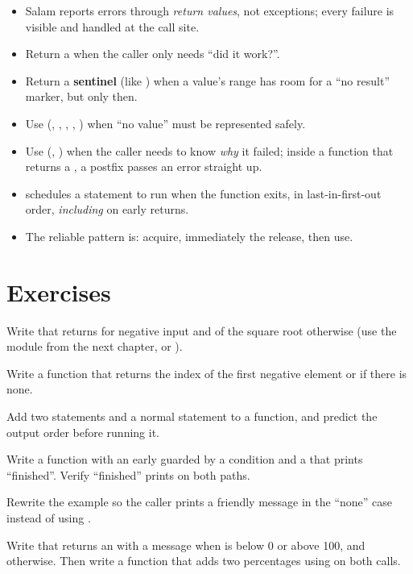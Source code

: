 \begin{itemize}[leftmargin=1.4em]
  \item Salam reports errors through \emph{return values}, not exceptions; every
        failure is visible and handled at the call site.
  \item Return a  when the caller only needs ``did it work?''.
  \item Return a \textbf{sentinel} (like ) when a value's range has room
        for a ``no result'' marker, but only then.
  \item Use  (, , ,
        , ) when ``no value'' must be represented safely.
  \item Use  (, ) when the caller
        needs to know \emph{why} it failed; inside a function that returns a
        , a postfix  passes an error straight up.
  \item {} schedules a statement to run when the function exits, in
        last-in-first-out order, \emph{including} on early returns.
  \item The reliable pattern is: acquire, immediately  the release,
        then use.
\end{itemize}

\section{Exercises}

\exercise Write  that returns
 for negative input and  of the square root otherwise (use
the  module from the next chapter, or ).

\exercise Write a function  that returns
the index of the first negative element or  if there is none.

\exercise Add two  statements and a normal statement to a function,
and predict the output order before running it.

\exercise Write a function with an early  guarded by a condition and a
 that prints ``finished''. Verify ``finished'' prints on both paths.

\exercise Rewrite the  example so the caller prints a friendly
message in the ``none'' case instead of using .

\exercise Write  that
returns an  with a message when  is below 0 or above 100, and
 otherwise. Then write a function that adds two percentages using
 on both calls.
